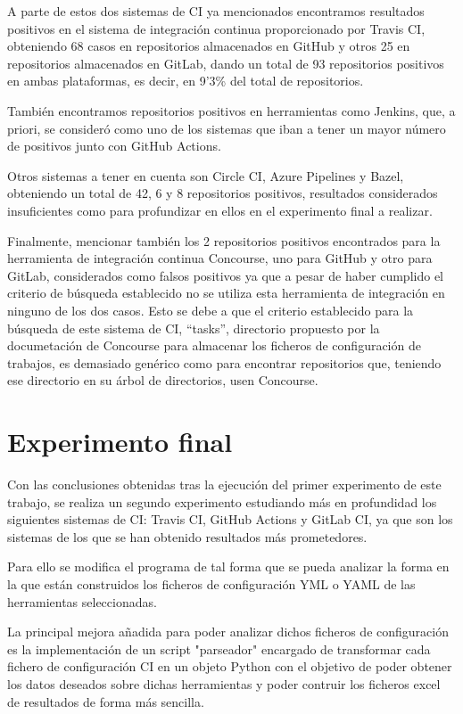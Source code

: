 A parte de estos dos sistemas de CI ya mencionados encontramos resultados positivos en el sistema de integración continua proporcionado por Travis CI, obteniendo 68 casos en repositorios almacenados en GitHub y otros 25 en repositorios almacenados en GitLab, dando un total de 93 repositorios positivos en ambas plataformas, es decir, en 9'3\% del total de repositorios.

También encontramos repositorios positivos en herramientas como Jenkins, que, a priori, se consideró como uno de los sistemas que iban a tener un mayor número de positivos junto con GitHub Actions.

Otros sistemas a tener en cuenta son Circle CI, Azure Pipelines y Bazel, obteniendo un total de 42, 6 y 8 repositorios positivos, resultados considerados insuficientes como para profundizar en ellos en el experimento final a realizar.

Finalmente, mencionar también los 2 repositorios positivos encontrados para la herramienta de integración continua Concourse, uno para GitHub y otro para GitLab, considerados como falsos positivos ya que a pesar de haber cumplido el criterio de búsqueda establecido no se utiliza esta herramienta de integración en ninguno de los dos casos. Esto se debe a que el criterio establecido para la búsqueda de este sistema de CI, ``tasks'', directorio propuesto por la documetación de Concourse para almacenar los ficheros de configuración de trabajos, es demasiado genérico como para encontrar repositorios que, teniendo ese directorio en su árbol de directorios, usen Concourse.

\section{Experimento final}
Con las conclusiones obtenidas tras la ejecución del primer experimento de este trabajo, se realiza un segundo experimento estudiando más en profundidad los siguientes sistemas de CI: Travis CI, GitHub Actions y GitLab CI, ya que son los sistemas de los que se han obtenido resultados más prometedores.

Para ello se modifica el programa de tal forma que se pueda analizar la forma en la que están construidos los ficheros de configuración YML o YAML de las herramientas seleccionadas.

La principal mejora añadida para poder analizar dichos ficheros de configuración es la implementación de un script "parseador" encargado de transformar cada fichero de configuración CI en un objeto Python con el objetivo de poder obtener los datos deseados sobre dichas herramientas y poder contruir los ficheros excel de resultados de forma más sencilla.

